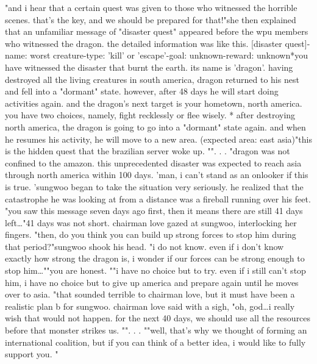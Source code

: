 "and i hear that a certain quest was given to those who witnessed the horrible scenes.
 that's the key, and we should be prepared for that!"she then explained that an unfamiliar message of "disaster quest" appeared before the wpu members who witnessed the dragon.
the detailed information was like this.
[disaster quest]-name: worst creature-type: 'kill' or 'escape'-goal: unknown-reward: unknown*you have witnessed the disaster that burnt the earth.
 its name is 'dragon'.
having destroyed all the living creatures in south america, dragon returned to his nest and fell into a "dormant" state.
 however, after 48 days he will start doing activities again.
 and the dragon's next target is your hometown, north america.
you have two choices, namely, fight recklessly or flee wisely.
* after destroying north america, the dragon is going to go into a "dormant" state again.
 and when he resumes his activity, he will move to a new area.
 (expected area: east asia)"this is the hidden quest that the brazilian server woke up.
"".
.
.
"dragon was not confined to the amazon.
 this unprecedented disaster was expected to reach asia through north america within 100 days.
'man, i can't stand as an onlooker if this is true.
'sungwoo began to take the situation very seriously.
 he realized that the catastrophe he was looking at from a distance was a fireball running over his feet.
"you saw this message seven days ago first, then it means there are still 41 days left…"41 days was not short.
 chairman love gazed at sungwoo, interlocking her fingers.
"then, do you think you can build up strong forces to stop him during that period?"sungwoo shook his head.
"i do not know.
 even if i don't know exactly how strong the dragon is, i wonder if our forces can be strong enough to stop him…""you are honest.
""i have no choice but to try.
 even if i still can't stop him, i have no choice but to give up america and prepare again until he moves over to asia.
"that sounded terrible to chairman love, but it must have been a realistic plan b for sungwoo.
 chairman love said with a sigh, "oh, god…i really wish that would not happen.
 for the next 40 days, we should use all the resources before that monster strikes us.
"".
.
.
""well, that's why we thought of forming an international coalition, but if you can think of a better idea, i would like to fully support you.
"

